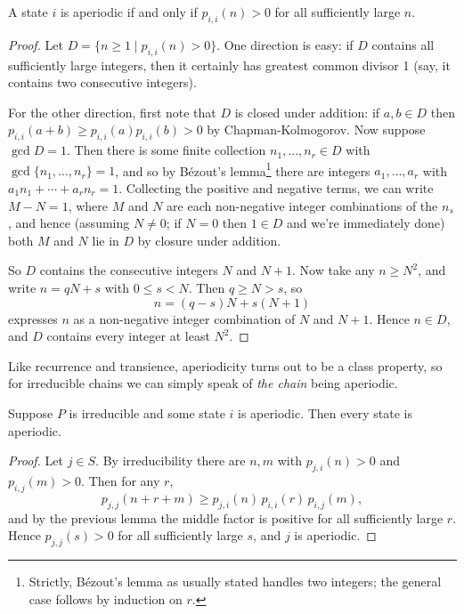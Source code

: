 \begin{lemma}
	A state $i$ is aperiodic if and only if $p_{i, i}(n) > 0$ for all sufficiently large $n$.
\end{lemma}
\begin{proof}
	Let $D = \{n \geq 1 \mid p_{i, i}(n) > 0\}$. One direction is easy: if $D$ contains all sufficiently large integers, then it certainly has greatest common divisor 1 (say, it contains two consecutive integers).

	For the other direction, first note that $D$ is closed under addition: if $a, b \in D$ then $p_{i, i}(a + b) \geq p_{i,i}(a) p_{i, i}(b) > 0$ by Chapman-Kolmogorov. Now suppose $\gcd D = 1$. Then there is some finite collection $n_1, \dots, n_r \in D$ with $\gcd\{n_1, \dots, n_r\} = 1$, and so by Bézout's lemma\footnote{Strictly, Bézout's lemma as usually stated handles two integers; the general case follows by induction on $r$.} there are integers $a_1, \dots, a_r$ with $a_1 n_1 + \cdots + a_r n_r = 1$. Collecting the positive and negative terms, we can write $M - N = 1$, where $M$ and $N$ are each non-negative integer combinations of the $n_s$, and hence (assuming $N \neq 0$; if $N = 0$ then $1 \in D$ and we're immediately done) both $M$ and $N$ lie in $D$ by closure under addition.

	So $D$ contains the consecutive integers $N$ and $N + 1$. Now take any $n \geq N^2$, and write $n = qN + s$ with $0 \leq s < N$. Then $q \geq N > s$, so
	$$
	n = (q - s)N + s(N + 1)
	$$
	expresses $n$ as a non-negative integer combination of $N$ and $N + 1$. Hence $n \in D$, and $D$ contains every integer at least $N^2$.
\end{proof}

Like recurrence and transience, aperiodicity turns out to be a class property, so for irreducible chains we can simply speak of \emph{the chain} being aperiodic.

\begin{lemma}
	Suppose $P$ is irreducible and some state $i$ is aperiodic. Then every state is aperiodic.
\end{lemma}
\begin{proof}
	Let $j \in S$. By irreducibility there are $n, m$ with $p_{j, i}(n) > 0$ and $p_{i, j}(m) > 0$. Then for any $r$,
	$$
	p_{j, j}(n + r + m) \geq p_{j, i}(n) \, p_{i, i}(r) \, p_{i, j}(m),
	$$
	and by the previous lemma the middle factor is positive for all sufficiently large $r$. Hence $p_{j, j}(s) > 0$ for all sufficiently large $s$, and $j$ is aperiodic.
\end{proof}

